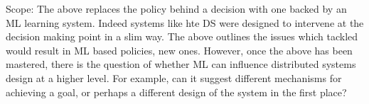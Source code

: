 \documentclass[a4paper,twocolumn]{article}
\newcommand{\ignore}[1]{}
\begin{document}
\ignore{
contextual multi-armed bandits. idea is to provide a context, get an action,
and only observe reward for that action. This matches the dist systems world well. It will generate new
policies using ML that we could not come up with by just thinking, and may not
even be able to describe. We argue in favor of opacity and rely instead on the guarantees
provided by the ML optimization.
}


Scope:
The above replaces the policy behind a decision with one backed by an ML learning system.
Indeed systems like hte DS were designed to intervene at the decision making point in a
slim way. The above outlines the issues which tackled would result in ML based policies,
new ones. However, once the above has been mastered, there is the question of whether ML
can influence distributed systems design at a higher level. For example, can it suggest
different mechanisms for achieving a goal, or perhaps a different design of the system in the first place?
\end{document}
